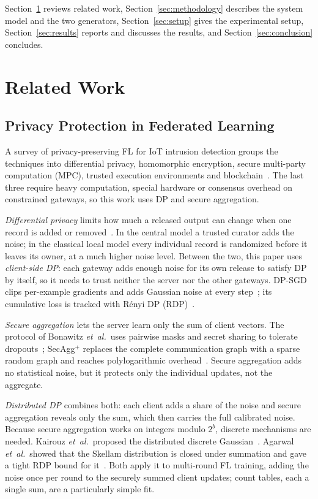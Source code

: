 \documentclass[conference]{IEEEtran}
\begin{document}
Section~\ref{sec:related_work} reviews related work, Section~\ref{sec:methodology} describes the system model and the two generators, Section~\ref{sec:setup} gives the experimental setup, Section~\ref{sec:results} reports and discusses the results, and Section~\ref{sec:conclusion} concludes.

\section{Related Work}\label{sec:related_work}

\subsection{Privacy Protection in Federated Learning}
A survey of privacy-preserving FL for IoT intrusion detection groups the techniques into differential privacy, homomorphic encryption, secure multi-party computation (MPC), trusted execution environments and blockchain~\cite{vyas2024}. The last three require heavy computation, special hardware or consensus overhead on constrained gateways, so this work uses DP and secure aggregation.

\textit{Differential privacy} limits how much a released output can change when one record is added or removed~\cite{dwork2014}. In the central model a trusted curator adds the noise; in the classical local model every individual record is randomized before it leaves its owner, at a much higher noise level. Between the two, this paper uses \textit{client-side DP}: each gateway adds enough noise for its own release to satisfy DP by itself, so it needs to trust neither the server nor the other gateways. DP-SGD clips per-example gradients and adds Gaussian noise at every step~\cite{abadi2016dpsgd}; its cumulative loss is tracked with R\'enyi DP (RDP)~\cite{mironov2017rdp}.

\textit{Secure aggregation} lets the server learn only the sum of client vectors. The protocol of Bonawitz \textit{et~al.}\ uses pairwise masks and secret sharing to tolerate dropouts~\cite{bonawitz2017}; SecAgg$^+$ replaces the complete communication graph with a sparse random graph and reaches polylogarithmic overhead~\cite{bell2020}. Secure aggregation adds no statistical noise, but it protects only the individual updates, not the aggregate.

\textit{Distributed DP} combines both: each client adds a share of the noise and secure aggregation reveals only the sum, which then carries the full calibrated noise. Because secure aggregation works on integers modulo $2^b$, discrete mechanisms are needed. Kairouz \textit{et~al.}\ proposed the distributed discrete Gaussian~\cite{kairouz2021}. Agarwal \textit{et~al.}\ showed that the Skellam distribution is closed under summation and gave a tight RDP bound for it~\cite{agarwal2021}. Both apply it to multi-round FL training, adding the noise once per round to the securely summed client updates; count tables, each a single sum, are a particularly simple fit.
\end{document}
